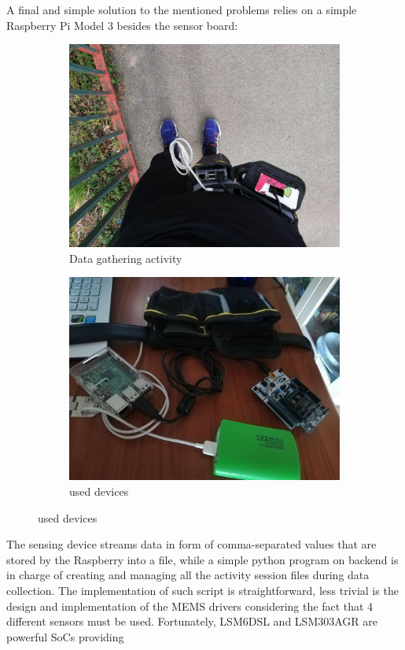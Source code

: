 A final and simple solution to the mentioned problems relies on a simple Raspberry Pi Model 3 besides the sensor board:
\begin{center}
	\begin{figure}[H]
		\begin{subfigure}[H]{0.45\textwidth}
			\includegraphics[scale=0.35]{figures/data_gathering_1.jpg}
			\caption{Data gathering activity}\label{fig:3a}
		\end{subfigure}
		\hfill
		\begin{subfigure}[H]{0.45\textwidth}
			\includegraphics[scale=0.35]{figures/data_gathering_2.jpg}
			\caption{used devices}\label{fig:3b}
		\end{subfigure}
	\end{figure} 
\end{center}
The sensing device streams data in form of comma-separated values that are stored by the Raspberry into a file, while a simple python program on backend is in charge of creating and managing all the activity session files during data collection.\newline
The implementation of such script is straightforward, less trivial is the design and implementation of the MEMS drivers considering the fact that 4 different sensors must be used. Fortunately, LSM6DSL and LSM303AGR are powerful SoCs providing 

